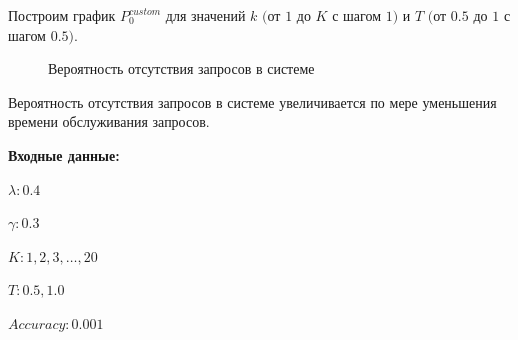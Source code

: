\documentclass[12pt, a4paper]{article}
\begin{document}
Построим график $P_0^{custom}$ для значений $k$ $($от $1$ до $K$ с шагом $1)$ и  $T$ $($от $0.5$ до $1$  с шагом $0.5)$.
\begin{figure}[h]
	\caption{Вероятность отсутствия запросов в системе}
	\label{ris4}
\end{figure}


Вероятность отсутствия запросов в системе увеличивается по мере уменьшения времени обслуживания запросов.

\pagebreak
\textbf{Входные данные:}

$\lambda: 0.4$

$\gamma: 0.3$

$K: 1, 2, 3, \ldots, 20$

$T: 0.5, 1.0$

$Accuracy: 0.001$
\end{document}
